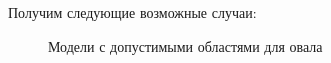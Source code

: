 \documentclass[11pt]{article}
\begin{document}
\begin{figure}[H]
\caption{}
\label{fig:intersection_of_fields}
\end{figure}

Получим следующие возможные случаи:

\begin{figure}[H]
\caption{Модели с допустимыми областями для овала}
\label{fig:curves_with_ovals}
\end{figure}
\end{document}
